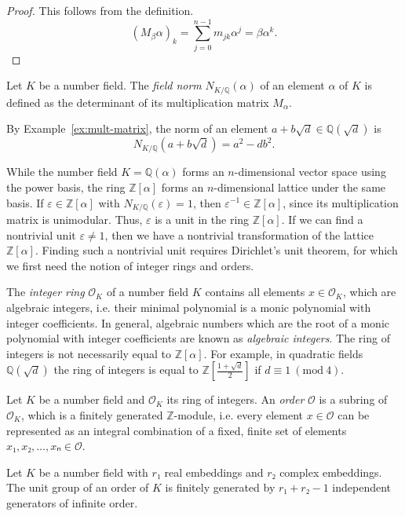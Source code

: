 \begin{proof}
  This follows from the definition.
  \[
    (M_β α)_k = \sum_{j=0}^{n-1} m_{jk} α^j = β α^k.
  \]
\end{proof}

\begin{definition}
  Let $K$ be a number field.
  The \emph{field norm} $N_{K/ℚ}(α)$ of an element $α$ of $K$ is defined as the
  determinant of its multiplication matrix $M_α$.
\end{definition}

\begin{example}
  By Example~\ref{ex:mult-matrix},
  the norm of an element $a + b \sqrt{d} ∈ ℚ(\sqrt{d})$ is
  \[
    N_{K/ℚ}(a + b \sqrt{d}) = a^2 - d b^2.
  \]
\end{example}

While the number field $K = ℚ(α)$ forms an $n$-dimensional vector space using
the power basis, the ring $ℤ[α]$ forms an $n$-dimensional lattice under the same basis.
If $ε ∈ ℤ[α]$ with $N_{K/ℚ}(ε) = 1$, then $ε^{-1} ∈ ℤ[α]$,
since its multiplication matrix is unimodular.
Thus, $ε$ is a unit in the ring $ℤ[α]$.
If we can find a nontrivial unit $ε ≠ 1$,
then we have a nontrivial transformation of the lattice $ℤ[α]$.
Finding such a nontrivial unit requires Dirichlet's unit theorem,
for which we first need the notion of integer rings and orders.

The \emph{integer ring} $\mathcal O_K$ of a number field $K$
contains all elements $x ∈ \mathcal O_K$, which are algebraic integers,
i.e. their minimal polynomial is a monic polynomial with integer coefficients.
In general, algebraic numbers which are the root of a monic polynomial with integer coefficients
are known as \emph{algebraic integers}.
The ring of integers is not necessarily equal to $ℤ[α]$.
For example, in quadratic fields $ℚ(\sqrt{d})$
the ring of integers is equal to $ℤ\left[\frac{1+\sqrt{d}}{2}\right]$ if $d ≡ 1\ (\mathrm{mod}\ 4)$.

\begin{definition}
  Let $K$ be a number field and $\mathcal O_K$ its ring of integers.
  An \emph{order} $\mathcal O$ is a subring of $\mathcal O_K$,
  which is a finitely generated $ℤ$-module,
  i.e. every element $x ∈ \mathcal O$ can be represented as an integral
  combination of a fixed, finite set of elements $x₁, x₂, …, xₙ ∈ \mathcal O$.
\end{definition}

\begin{theorem}
  \label{thm:dirichlet-unit}
  Let $K$ be a number field with $r₁$ real embeddings and $r₂$ complex embeddings.
  The unit group of an order of $K$ is finitely generated by $r₁ + r₂ - 1$
  independent generators of infinite order.
\end{theorem}

